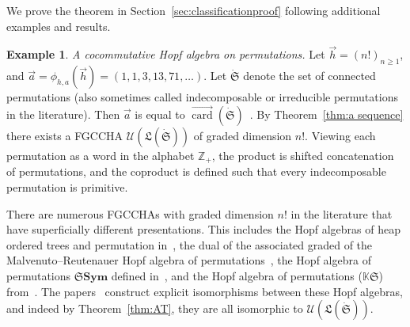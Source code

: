 \documentclass[11pt]{amsart}
\theoremstyle{definition}
\newtheorem{example}[theorem]{Example}
\numberwithin{equation}{section}
\def\ZZ{{\mathbb Z}}
\newcommand{\FGCCHAs}{\textsf{FGCCHA}s\xspace}
\newcommand{\veccard}{\overrightarrow{\operatorname{card}}}
\begin{document}
We prove the theorem in Section~\ref{sec:classificationproof} following additional examples and results. 

\begin{example}
\label{example:hopf_algebras_of_permutations}
\textit{A cocommutative Hopf algebra on permutations.}
    Let $\vec{h} = (n!)_{n \geq 1}$, and $\vec{a} = \phi_{h,a}(\vec{h}) = (1,1,3,13,71,\ldots)$.
    Let $\dot{\mathfrak{S}}$ denote the set of connected permutations \cite{AS05}
    (also sometimes called indecomposable or irreducible permutations in the literature).
    Then $\vec{a}$ is equal to $\veccard(\dot{\mathfrak{S}})$~\cite[A003319]{OEIS}.
    By Theorem~\ref{thm:a sequence} there exists a \textsf{FGCCHA}
    $\mathcal{U}(\mathfrak{L}(\dot{\mathfrak{S}}))$ of graded dimension $n!$.
    Viewing each permutation as a word in the alphabet $\ZZ_{+}$, the product is shifted
    concatenation of permutations, and the coproduct is defined such that
    every indecomposable permutation is primitive.
    
    There are numerous \FGCCHAs with graded dimension $n!$ in the literature that have superficially different presentations.  
    This includes the Hopf algebras of heap ordered trees and permutation in~\cite{GL09}, the dual of the associated graded of the Malvenuto--Reutenauer Hopf algebra of permutations~\cite{AS05cc}, the Hopf algebra of permutations $\mathbf{\mathfrak{S}Sym}$ defined in~\cite[\S 3]{HNT08}, and the Hopf algebra of permutations ($\mathbb{K}\mathfrak{S}$) from~\cite[\S 5]{Li15}.
    The papers~\cite{AS05cc, GL09, HNT08, Li15} construct explicit isomorphisms between these Hopf algebras, and indeed by Theorem~\ref{thm:AT}, they are all isomorphic to $\mathcal{U}(\mathfrak{L}(\dot{\mathfrak{S}}))$.
    \end{example}
\end{document}
